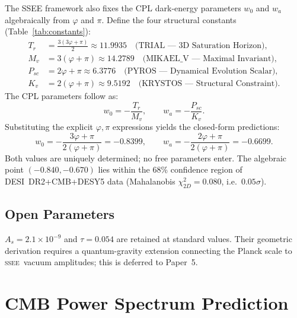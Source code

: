 \documentclass[12pt,a4paper]{article}
\newcommand{\SSEE}{\ifmmode\mathrm{SSEE}\else\textsc{ssee}\fi}
\begin{document}
The SSEE framework also fixes the CPL dark-energy parameters $w_0$ and $w_a$
algebraically from $\varphi$ and $\pi$.
Define the four structural constants (Table~\ref{tab:constants}):
\begin{align}
  T_r    &= \tfrac{3(3\varphi+\pi)}{2} \approx 11.9935 \quad \text{(TRIAL — 3D Saturation Horizon)}, \\
  M_v    &= 3(\varphi+\pi)              \approx 14.2789 \quad \text{(MIKAEL\_V — Maximal Invariant)}, \\
  P_{sc} &= 2\varphi+\pi               \approx  6.3776 \quad \text{(PYROS — Dynamical Evolution Scalar)}, \\
  K_v    &= 2(\varphi+\pi)             \approx  9.5192 \quad \text{(KRYSTOS — Structural Constraint)}.
\end{align}
The CPL parameters follow as:
\begin{equation}
  w_0 = -\frac{T_r}{M_v}, \qquad w_a = -\frac{P_{sc}}{K_v}.
\end{equation}
Substituting the explicit $\varphi,\pi$ expressions yields the closed-form predictions:
\begin{equation}
  \boxed{w_0 = -\frac{3\varphi+\pi}{2(\varphi+\pi)} = -0.8399},
  \qquad
  \boxed{w_a = -\frac{2\varphi+\pi}{2(\varphi+\pi)} = -0.6699}.
  \label{eq:w0wa_p4}
\end{equation}
Both values are uniquely determined; no free parameters enter.
The algebraic point $(-0.840,-0.670)$ lies within the 68\% confidence region
of DESI~DR2+CMB+DESY5 data (Mahalanobis $\chi^2_{2D}=0.080$, i.e.\ $0.05\sigma$).

\subsection{Open Parameters}

$A_s = 2.1\times10^{-9}$ and $\tau = 0.054$ are retained at standard values.
Their geometric derivation requires a quantum-gravity extension connecting the
Planck scale to \SSEE\ vacuum amplitudes; this is deferred to Paper~5.

\section{CMB Power Spectrum Prediction}
\label{sec:cmb}
\end{document}
